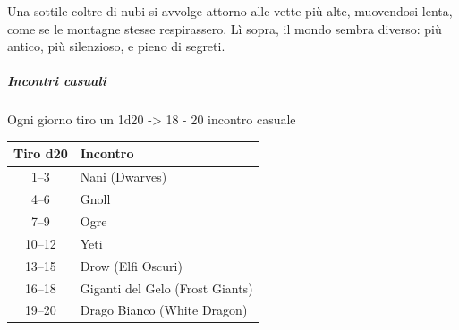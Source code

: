 \documentclass{article}
\begin{document}
Una sottile coltre di nubi si avvolge attorno alle vette più alte, muovendosi lenta, come se le montagne stesse respirassero. Lì sopra, il mondo sembra diverso: più antico, più silenzioso, e pieno di segreti.
    \subparagraph{Incontri casuali}
            Ogni giorno tiro un 1d20 -> 18 - 20 incontro casuale
            \begin{center}
                \begin{tabular}{|c|l|}
                \hline
                \textbf{Tiro d20} & \textbf{Incontro} \\
                \hline
                1--3   & Nani (Dwarves) \\
                4--6   & Gnoll \\
                7--9   & Ogre \\
                10--12 & Yeti \\
                13--15 & Drow (Elfi Oscuri) \\
                16--18 & Giganti del Gelo (Frost Giants) \\
                19--20 & Drago Bianco (White Dragon) \\
                \hline
                \end{tabular}
            \end{center}
\end{document}
